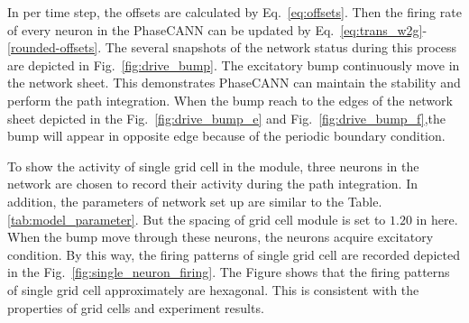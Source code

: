 \documentclass[final,5p,times,twocolumn]{elsarticle}
\begin{document}
In per time step, the offsets are calculated by Eq.~\eqref{eq:offsets}. Then the firing rate of every neuron in the PhaseCANN can be updated by Eq.~\eqref{eq:trans_w2g}-\eqref{rounded-offsets}. The several snapshots of the network status during this process are depicted in Fig.~\ref{fig:drive_bump}. The excitatory bump continuously move in the network sheet. This demonstrates PhaseCANN can maintain the stability and perform the path integration. When the bump reach to the edges of the network sheet depicted in the Fig.~\ref{fig:drive_bump_e} and Fig.~\ref{fig:drive_bump_f},the bump will appear in opposite edge because of the periodic boundary condition.

To show the activity of single grid cell in the module, three neurons in the network are chosen to record their activity during the path integration. In addition, the parameters of network set up are similar to the  Table.\ref{tab:model_parameter}. But the spacing of grid cell module is set to $1.20$ in here. When the bump move through these neurons, the neurons acquire excitatory condition. By this way, the firing patterns of single grid cell are recorded depicted in the Fig.~\ref{fig:single_neuron_firing}. The Figure shows that the firing patterns of single grid cell approximately are hexagonal. This is consistent with the properties of grid cells and experiment results\citep{Hafting2005}.
\end{document}
